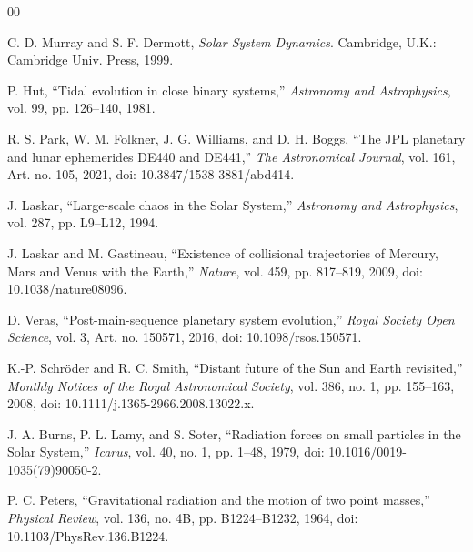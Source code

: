 \documentclass[10pt,conference]{IEEEtran}
\begin{document}
\begin{thebibliography}{00}

C. D. Murray and S. F. Dermott, \emph{Solar System Dynamics}. Cambridge, U.K.: Cambridge Univ. Press, 1999.

P. Hut, ``Tidal evolution in close binary systems,'' \emph{Astronomy and Astrophysics}, vol. 99, pp. 126--140, 1981.

R. S. Park, W. M. Folkner, J. G. Williams, and D. H. Boggs, ``The JPL planetary and lunar ephemerides DE440 and DE441,'' \emph{The Astronomical Journal}, vol. 161, Art. no. 105, 2021, doi: 10.3847/1538-3881/abd414.

J. Laskar, ``Large-scale chaos in the Solar System,'' \emph{Astronomy and Astrophysics}, vol. 287, pp. L9--L12, 1994.

J. Laskar and M. Gastineau, ``Existence of collisional trajectories of Mercury, Mars and Venus with the Earth,'' \emph{Nature}, vol. 459, pp. 817--819, 2009, doi: 10.1038/nature08096.

D. Veras, ``Post-main-sequence planetary system evolution,'' \emph{Royal Society Open Science}, vol. 3, Art. no. 150571, 2016, doi: 10.1098/rsos.150571.

K.-P. Schr\"oder and R. C. Smith, ``Distant future of the Sun and Earth revisited,'' \emph{Monthly Notices of the Royal Astronomical Society}, vol. 386, no. 1, pp. 155--163, 2008, doi: 10.1111/j.1365-2966.2008.13022.x.

J. A. Burns, P. L. Lamy, and S. Soter, ``Radiation forces on small particles in the Solar System,'' \emph{Icarus}, vol. 40, no. 1, pp. 1--48, 1979, doi: 10.1016/0019-1035(79)90050-2.

P. C. Peters, ``Gravitational radiation and the motion of two point masses,'' \emph{Physical Review}, vol. 136, no. 4B, pp. B1224--B1232, 1964, doi: 10.1103/PhysRev.136.B1224.

\end{thebibliography}
\end{document}
